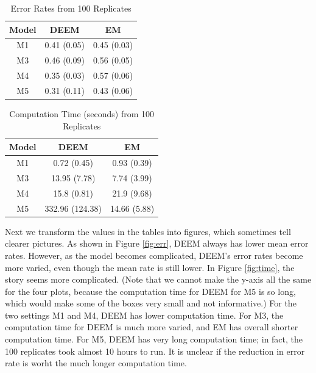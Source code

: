 \documentclass[11pt]{article}
\begin{document}
\begin{table}[H]
    \centering
    \begin{tabular}{c|cc}
       Model  &  DEEM & EM \\
       \hline
         M1 & 0.41 (0.05) & 0.45 (0.03) \\
         M3 &  0.46 (0.09) & 0.56 (0.05) \\
         M4 &  0.35 (0.03) & 0.57 (0.06) \\ 
         M5 &  0.31 (0.11) & 0.43 (0.06) \\
    \end{tabular}
    \caption{Error Rates from 100 Replicates}
    \label{tab:err}
\end{table}

\begin{table}[H]
    \centering
    \begin{tabular}{c|cc}
       Model  &  DEEM & EM \\
       \hline
         M1 & 0.72 (0.45) & 0.93 (0.39) \\
         M3 &  13.95 (7.78) & 7.74 (3.99) \\
         M4 &  15.8 (0.81) & 21.9 (9.68) \\ 
         M5 &  332.96 (124.38) & 14.66 (5.88) \\
    \end{tabular}
    \caption{Computation Time (seconds) from 100 Replicates}
    \label{tab:time}
\end{table}

Next we transform the values in the tables into figures, which sometimes tell clearer pictures. As shown in Figure \ref{fig:err}, DEEM always has lower mean error rates. However, as the model becomes complicated, DEEM's error rates become more varied, even though the mean rate is still lower. In Figure \ref{fig:time}, the story seems more complicated. (Note that we cannot make the y-axis all the same for the four plots, because the computation time for DEEM for M5 is so long, which would make some of the boxes very small and not informative.) For the two settings M1 and M4, DEEM has lower computation time. For M3, the computation time for DEEM is much more varied, and EM has overall shorter computation time. For M5, DEEM has very long computation time; in fact, the 100 replicates took almost 10 hours to run. It is unclear if the reduction in error rate is worht the much longer computation time.
\end{document}
